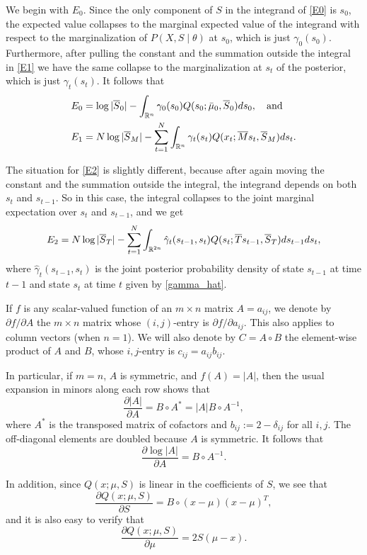 \documentclass[12pt,leqno]{article}
\begin{document}
We begin with $E_0$. Since the only component of $S$ in the integrand of \eqref{E0} is $s_0$, the expected value
collapses to the marginal 
expected value of the integrand with respect to the marginalization of $P(X,S\mid\theta)$ at $s_0$, which is just 
$\gamma_0(s_0)$.  Furthermore, after pulling the constant and the summation 
outside the integral in \eqref{E1} we have the same collapse to the marginalization at $s_t$ of the posterior, which
is just $\gamma_t(s_t)$.  It follows that
\begin{align*}
E_0 &= \log|\overline{S}_0| - \int_{{\mathbb R}^n}\gamma_0(s_0)Q(s_0;\bar{\mu}_0,\overline{S}_0)ds_0,\quad\text{and}\\
E_1 &= N\log|\overline{S}_M| - \sum_{t=1}^N\int_{{\mathbb R}^n}\gamma_t(s_t)Q(x_t;\overline{M}s_t,\overline{S}_M)ds_t.
\end{align*}

The situation for \eqref{E2} is slightly different, because after again moving the constant and the summation outside
the integral, the integrand depends on both $s_t$ and $s_{t-1}$.  So in this case, the integral collapses to the 
joint marginal expectation over $s_t$ and $s_{t-1}$, and we get
$$
E_2 = N\log|\overline{S}_T| - \sum_{t=1}^N\int_{{\mathbb R}^{2n}}\hat{\gamma}_t(s_{t-1},s_t)Q(s_t;\overline{T}s_{t-1},\overline{S}_T)ds_{t-1}ds_t,
$$
where $\hat{\gamma}_t(s_{t-1},s_t)$ is the joint posterior probability density of state $s_{t-1}$ at time $t-1$ and state $s_t$ 
at time $t$ given by \eqref{gamma_hat}.

If $f$ is any scalar-valued function of an $m\times{n}$ matrix $A = a_{ij}$, we denote by $\partial{f}/\partial{A}$ the 
$m\times{n}$ matrix whose $(i,j)$-entry is $\partial{f}/\partial{a_{ij}}$.  This also applies to column vectors
(when $n=1$). We will also denote by $C = A\circ{B}$ the element-wise product of $A$ and $B$, whose $i,j$-entry is
$c_{ij} = a_{ij}b_{ij}$.

In particular, if $m=n$, $A$ is symmetric, and $f(A) = |A|$,  then the usual expansion 
in minors along each row shows that 
$$
\frac{\partial{|A|}}{\partial{A}} = B\circ{A}^* = |A|B\circ{A}^{-1},
$$
where $A^*$ is the transposed matrix of cofactors and $b_{ij} := 2-\delta_{ij}$ for all $i,j$.
The off-diagonal elements are doubled because $A$ is symmetric.
It follows that
$$
\frac{\partial{\log|A|}}{\partial{A}} = B\circ{A}^{-1}. 
$$

In addition, since $Q(x;\mu,S)$ is linear in the coefficients of $S$, we see that
$$
\frac{\partial{Q(x;\mu,S)}}{\partial{S}} = B\circ(x-\mu)(x-\mu)^T,
$$
and it is also easy to verify that
$$
\frac{\partial{Q(x;\mu,S)}}{\partial{\mu}} = 2S(\mu-x).
$$
\end{document}
